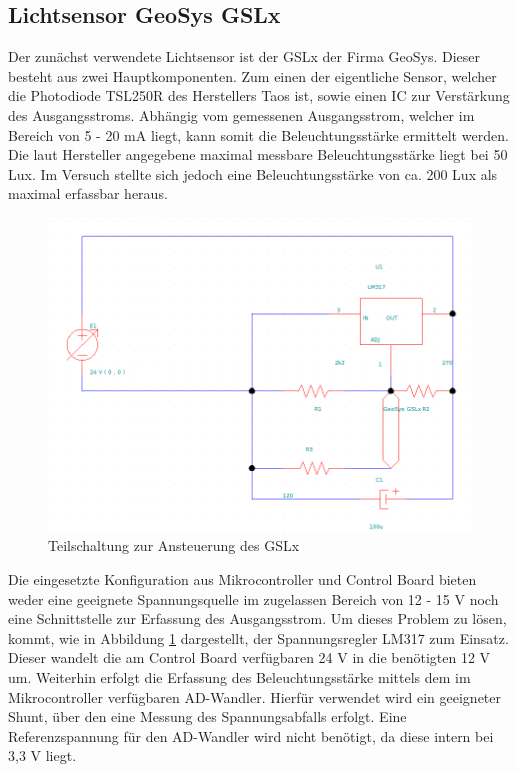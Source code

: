 \documentclass[a4paper,12pt]{scrartcl}
\begin{document}
\subsection{Lichtsensor GeoSys GSLx}
Der zunächst verwendete Lichtsensor ist der GSLx der Firma GeoSys. Dieser besteht aus zwei Hauptkomponenten. Zum einen der eigentliche Sensor, welcher die Photodiode TSL250R des Herstellers Taos ist, sowie einen IC zur Verstärkung des Ausgangsstroms. Abhängig vom gemessenen Ausgangsstrom, welcher im Bereich von 5 - 20 mA liegt, kann somit die Beleuchtungsstärke ermittelt werden. Die laut Hersteller angegebene maximal messbare Beleuchtungsstärke liegt bei 50 Lux. Im Versuch stellte sich jedoch eine Beleuchtungsstärke von ca. 200 Lux als maximal erfassbar heraus.
\begin{figure}[htb]
\begin{center}
  \includegraphics{./images/schaltung-geosys-gslx.png}
\end{center}
\caption[Teilschaltung zur Ansteuerung des GSLx, Quelle: Autoren]{\label{fig:schaltungGSLx}Teilschaltung zur Ansteuerung des GSLx}
\end{figure}

Die eingesetzte Konfiguration aus Mikrocontroller und Control Board bieten weder eine geeignete Spannungsquelle im zugelassen Bereich von 12 - 15 V noch eine Schnittstelle zur Erfassung des Ausgangsstrom. Um dieses Problem zu lösen, kommt, wie in Abbildung \ref{fig:schaltungGSLx} dargestellt, der Spannungsregler LM317 zum Einsatz. Dieser wandelt die am Control Board verfügbaren 24 V in die benötigten 12 V um. Weiterhin erfolgt die Erfassung des Beleuchtungsstärke mittels dem im Mikrocontroller verfügbaren AD-Wandler. Hierfür verwendet wird ein geeigneter Shunt, über den eine Messung des Spannungsabfalls erfolgt. Eine Referenzspannung für den AD-Wandler wird nicht benötigt, da diese intern bei 3,3 V liegt. 
\end{document}
